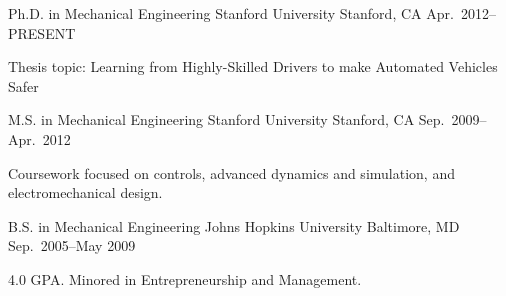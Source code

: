 \begin{cventries}
  \cventry%
    {Ph.D. in Mechanical Engineering}
    {Stanford University}
    {Stanford, CA}
    {Apr.\ 2012--PRESENT}
    {
      \begin{cvitems}
        \item{Thesis topic: Learning from Highly-Skilled Drivers to make Automated Vehicles Safer}
      \end{cvitems}
    }

  \cventry%
    {M.S. in Mechanical Engineering}
    {Stanford University}
    {Stanford, CA}
    {Sep.\ 2009--Apr.\ 2012}
    {
      \begin{cvitems}
        \item{Coursework focused on controls, advanced dynamics and simulation, and electromechanical design.}
      \end{cvitems}
    }

  \cventry%
    {B.S. in Mechanical Engineering}
    {Johns Hopkins University}
    {Baltimore, MD}
    {Sep.\ 2005--May 2009}
    {
      \begin{cvitems}
        \item{4.0 GPA\@. Minored in Entrepreneurship and Management.}
      \end{cvitems}
    }
\end{cventries}
